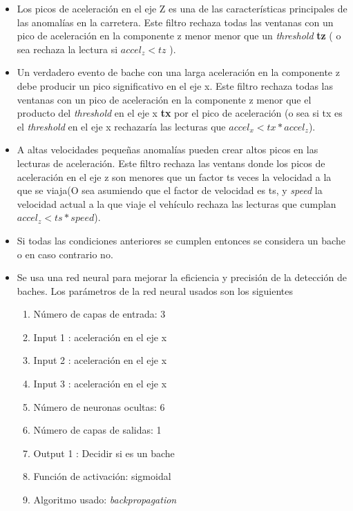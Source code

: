 \begin{itemize}
	\item Los picos de aceleración en el eje Z es una de las características principales de las anomalías en la carretera. Este filtro rechaza todas 
	las ventanas con un pico de aceleración en la componente z menor menor que un \emph{threshold} \textbf{tz} ( o sea rechaza la lectura si $accel_z < tz$ ).
	\item Un verdadero evento de bache con una larga aceleración en la componente z debe producir un pico significativo en el eje x. Este filtro rechaza 
	todas las ventanas con un pico de aceleración en la componente z menor que  el producto del \emph{threshold} en el eje x \textbf{tx} por  el pico de aceleración (o sea 
	si tx es el \emph{threshold} en el eje x rechazaría las lecturas que $accel_x < tx * accel_z$).
	\item A altas velocidades pequeñas anomalías pueden crear altos picos en las lecturas de aceleración. Este filtro rechaza las ventans donde los picos de 
	aceleración en el eje z son menores que un factor ts veces la velocidad a la que se viaja(O sea asumiendo que el factor de velocidad es ts, y \emph{speed} la velocidad actual 
	a la que viaje el vehículo rechaza las lecturas que cumplan $accel_z < ts * speed$). 
	\item  Si todas las condiciones anteriores se cumplen entonces se considera un bache o en caso contrario no.
	\item  Se usa una red neural para mejorar la eficiencia y precisión de la detección de baches. Los parámetros de la red neural usados son los siguientes
	\begin{enumerate}
		\item Número de capas de entrada: 3
		\item Input 1 : aceleración en el eje x
		\item Input 2 : aceleración en el eje x
		\item Input 3 : aceleración en el eje x
		\item Número de neuronas ocultas: 6
		\item Número de capas de salidas: 1
		\item Output 1 : Decidir si es un bache
		\item Función de activación: sigmoidal
		\item Algoritmo usado: \emph{backpropagation}
	\end{enumerate}
	
\end{itemize}

